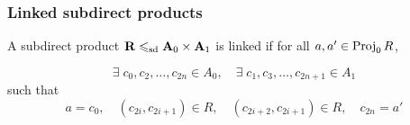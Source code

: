 \documentclass[9pt,xcolor=dvipsnames%
   ]{beamer}
\renewcommand{\alert}[1]{\textcolor{olivegreen}{#1}}
\begin{document}
\begin{frame}
  \frametitle{Linked subdirect products}
  A subdirect product $\mathbf{R} \leqslant_{\mathrm{sd}} \mathbf{A}_0 \times \mathbf{A}_1$ is \alert{linked} if
  for all $a, a' \in \operatorname{Proj}_0 R$,
  
  \[\exists\; c_0, c_2, \dots, c_{2n} \in A_0, \quad
  \exists\; c_1, c_3, \dots, c_{2n+1} \in A_1\]
  such that
  \[
  a = c_0, \quad
  (c_{2i},c_{2i+1})\in R,\quad
  (c_{2i+2},c_{2i+1})\in R,\quad c_{2n} = a'
  \]


  \bigskip
\end{frame}
\end{document}
